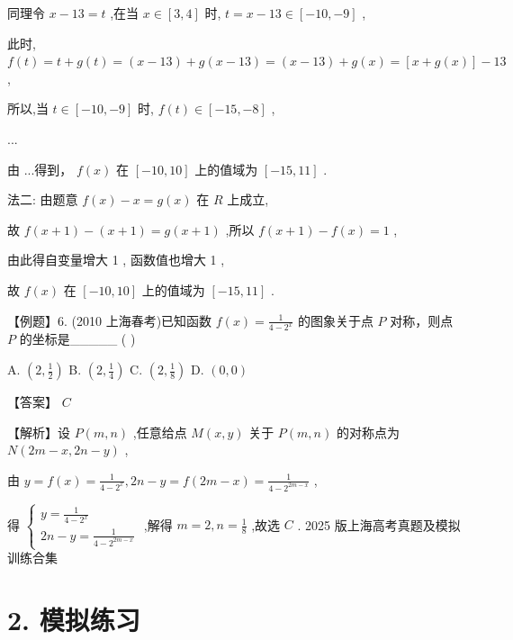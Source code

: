 \documentclass[10pt]{article}
\newcommand*\circled[1]{\tikz[baseline=(char.base)]{\node[shape=circle,draw,inner sep=1.5pt] (char) {\small #1};}}
\begin{document}
同理令 \(x - {13} = t\) ,在当 \(x \in  \left\lbrack  {3,4}\right\rbrack\) 时, \(t = x - {13} \in  \left\lbrack  {-{10}, - 9}\right\rbrack\) ,

此时, \(f\left( t\right)  = t + g\left( t\right)  = \left( {x - {13}}\right)  + g\left( {x - {13}}\right)  = \left( {x - {13}}\right)  + g\left( x\right)  = \left\lbrack  {x + g\left( x\right) }\right\rbrack   - {13}\) ,

所以,当 \(t \in  \left\lbrack  {-{10}, - 9}\right\rbrack\) 时, \(f\left( t\right)  \in  \left\lbrack  {-{15}, - 8}\right\rbrack\)  \circled{2} ,

...

由 \circled{1}  \circled{2} ...得到， \(f\left( x\right)\) 在 \(\left\lbrack  {-{10},{10}}\right\rbrack\) 上的值域为 \(\left\lbrack  {-{15},{11}}\right\rbrack\) .

法二: 由题意 \(f\left( x\right)  - x = g\left( x\right)\) 在 \(R\) 上成立,

故 \(f\left( {x + 1}\right)  - \left( {x + 1}\right)  = g\left( {x + 1}\right)\) ,所以 \(f\left( {x + 1}\right)  - f\left( x\right)  = 1\) ,

由此得自变量增大 1 , 函数值也增大 1 ,

故 \(f\left( x\right)\) 在 \(\left\lbrack  {-{10},{10}}\right\rbrack\) 上的值域为 \(\left\lbrack  {-{15},{11}}\right\rbrack\) .

【例题】6. (2010 上海春考)已知函数 \(f\left( x\right)  = \frac{1}{4 - {2}^{x}}\) 的图象关于点 \(P\) 对称，则点 \(P\) 的坐标是\_\_\_\_\_ ( )

A. \(\left( {2,\frac{1}{2}}\right)\) B. \(\left( {2,\frac{1}{4}}\right)\) C. \(\left( {2,\frac{1}{8}}\right)\) D. \(\left( {0,0}\right)\)

【答案】 \(C\)

【解析】设 \(P\left( {m,n}\right)\) ,任意给点 \(M\left( {x,y}\right)\) 关于 \(P\left( {m,n}\right)\) 的对称点为 \(N\left( {{2m} - x,{2n} - y}\right)\) ,

由 \(y = f\left( x\right)  = \frac{1}{4 - {2}^{x}},{2n} - y = f\left( {{2m} - x}\right)  = \frac{1}{4 - {2}^{{2m} - x}}\) ,

得 \(\left\{  \begin{array}{l} y = \frac{1}{4 - {2}^{x}} \\  {2n} - y = \frac{1}{4 - {2}^{{2m} - x}} \end{array}\right.\) ,解得 \(m = 2,n = \frac{1}{8}\) ,故选 \(C\) . 2025 版上海高考真题及模拟训练合集

\section*{2. 模拟练习}
\end{document}
